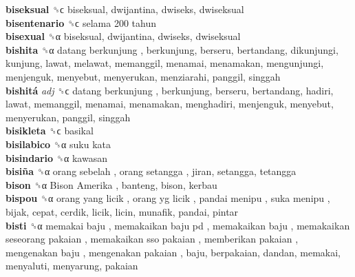 \textbf{biseksual} ␝ϲ  biseksual, dwijantina, dwiseks, dwiseksual  \\
\textbf{bisentenario} ␝ϲ   selama 200 tahun   \\
\textbf{bisexual} ␝α  biseksual, dwijantina, dwiseks, dwiseksual  \\
\textbf{bishita} ␝α   datang berkunjung , berkunjung, berseru, bertandang, dikunjungi, kunjung, lawat, melawat, memanggil, menamai, menamakan, mengunjungi, menjenguk, menyebut, menyerukan, menziarahi, panggil, singgah  \\
\textbf{bishitá} \emph{adj}  ␝ϲ   datang berkunjung , berkunjung, berseru, bertandang, hadiri, lawat, memanggil, menamai, menamakan, menghadiri, menjenguk, menyebut, menyerukan, panggil, singgah  \\
\textbf{bisikleta} ␝ϲ  basikal  \\
\textbf{bisilabico} ␝α   suku kata   \\
\textbf{bisindario} ␝α  kawasan  \\
\textbf{bisiña} ␝α   orang sebelah ,  orang setangga , jiran, setangga, tetangga  \\
\textbf{bison} ␝α   Bison Amerika , banteng, bison, kerbau  \\
\textbf{bispou} ␝α   orang yang licik ,  orang yg licik ,  pandai menipu ,  suka menipu , bijak, cepat, cerdik, licik, licin, munafik, pandai, pintar  \\
\textbf{bisti} ␝α   memakai baju ,  memakaikan baju pd ,  memakaikan baju ,  memakaikan seseorang pakaian ,  memakaikan sso pakaian ,  memberikan pakaian ,  mengenakan baju ,  mengenakan pakaian , baju, berpakaian, dandan, memakai, menyaluti, menyarung, pakaian  \\
